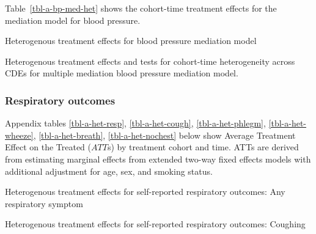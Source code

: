 \documentclass[
  letterpaper,
  DIV=11,
  numbers=noendperiod]{scrartcl}
\makeatletter
\renewenvironment{table}%
   {\renewcommand\familydefault\sfdefault
    \@float{table}}
   {\end@float}
\makeatother
\begin{document}
Table~\ref{tbl-a-bp-med-het} shows the cohort-time treatment effects for
the mediation model for blood pressure.

\begin{table}

\caption{\label{tbl-a-bp-med-het}Heterogenous treatment effects for
blood pressure mediation model}

\centering{

}

\end{table}%

\begin{table}

\caption{\label{tbl-a-bp-med-het-tests}Heterogenous treatment effects
and tests for cohort-time heterogeneity across CDEs for multiple
mediation blood pressure mediation model.}

\centering{

}

\end{table}%

\newpage

\subsubsection{Respiratory outcomes}\label{respiratory-outcomes}

Appendix tables \ref{tbl-a-het-resp}, \ref{tbl-a-het-cough},
\ref{tbl-a-het-phlegm}, \ref{tbl-a-het-wheeze}, \ref{tbl-a-het-breath},
\ref{tbl-a-het-nochest} below show Average Treatment Effect on the
Treated (\(ATT\)s) by treatment cohort and time. ATTs are derived from
estimating marginal effects from extended two-way fixed effects models
with additional adjustment for age, sex, and smoking status.

\begin{table}

\caption{\label{tbl-a-het-resp}Heterogenous treatment effects for
self-reported respiratory outcomes: Any respiratory symptom}

\centering{

}

\end{table}%

\begin{table}

\caption{\label{tbl-a-het-cough}Heterogenous treatment effects for
self-reported respiratory outcomes: Coughing}

\centering{

}

\end{table}%
\end{document}
